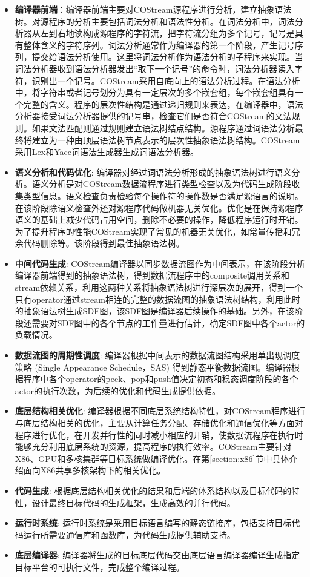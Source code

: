 \begin{itemize}	
  \item {\bf 编译器前端}：编译器前端主要对COStream源程序进行分析，建立抽象语法树。对源程序的分析主要包括词法分析和语法性分析。在词法分析中，词法分析器从左到右地读构成源程序的字符流，把字符流分组为多个记号，记号是具有整体含义的字符序列。词法分析通常作为编译器的第一个阶段，产生记号序列，提交给语法分析使用。这里将词法分析作为语法分析的子程序来实现。当词法分析器收到语法分析器发出“取下一个记号”的命令时，词法分析器读入字符，识别出一个记号。COStream采用自底向上的语法分析过程。在语法分析中，将字符串或者记号划分为具有一定层次的多个嵌套组，每个嵌套组具有一个完整的含义。程序的层次性结构是通过递归规则来表达，在编译器中，语法分析器接受词法分析器提供的记号串，检查它们是否符合COStream的文法规则。如果文法匹配则通过规则建立语法树结点结构。源程序通过词语法分析最终将建立为一种由顶层语法树节点表示的层次性抽象语法树结构。COStream采用Lex和Yacc词语法生成器生成词语法分析器。

  \item {\bf 语义分析和代码优化}: 编译器对经过词语法分析形成的抽象语法树进行语义分析。语义分析是对COStream数据流程序进行类型检查以及为代码生成阶段收集类型信息。语义检查负责检验每个操作符的操作数是否满足源语言的说明。在该阶段除语义检查外还对源程序代码做机器无关优化。优化是在保持源程序语义的基础上减少代码占用空间，删除不必要的操作，降低程序运行时开销。为了提升程序的性能COStream实现了常见的机器无关优化，如常量传播和冗余代码删除等。该阶段得到最佳抽象语法树。
  \item {\bf 中间代码生成}: COStream编译器以同步数据流图作为中间表示，在该阶段分析编译器前端得到的抽象语法树，得到数据流程序中的composite调用关系和stream依赖关系，利用这两种关系将抽象语法树进行深层次的展开，得到一个只有operator通过stream相连的完整的数据流图的抽象语法树结构，利用此时的抽象语法树生成SDF图，该SDF图是编译器后续操作的基础。另外，在该阶段还需要对SDF图中的各个节点的工作量进行估计，确定SDF图中各个actor的负载情况。
  \item {\bf 数据流图的周期性调度}: 编译器根据中间表示的数据流图结构采用单出现调度策略 (Single Appearance Schedule，SAS) 得到静态平衡数据流图。编译器根据程序中各个operator的peek、pop和push值决定初态和稳态调度阶段的各个actor的执行次数，为后续的优化和代码生成提供依据。
  \item {\bf 底层结构相关优化}: 编译器根据不同底层系统结构特性，对COStream程序进行与底层结构相关的优化，主要从计算任务分配、存储优化和通信优化等方面对程序进行优化，在开发并行性的同时减小相应的开销，使数据流程序在执行时能够充分利用底层系统的资源，提高程序的执行效率。COStream主要针对X86、GPU和多核集群等目标系统做编译优化。在第\ref{section:x86}节中具体介绍面向X86共享多核架构下的相关优化。
  \item {\bf 代码生成}: 根据底层结构相关优化的结果和后端的体系结构以及目标代码的特性，设计最终目标代码的生成框架，生成高效的并行代码。
  \item {\bf 运行时系统}: 运行时系统是采用目标语言编写的静态链接库，包括支持目标代码运行所需要通信库和函数库，为代码生成提供辅助支持。
  \item {\bf 底层编译器}: 编译器将生成的目标底层代码交由底层语言编译器编译生成指定目标平台的可执行文件，完成整个编译过程。
  
\end{itemize}

